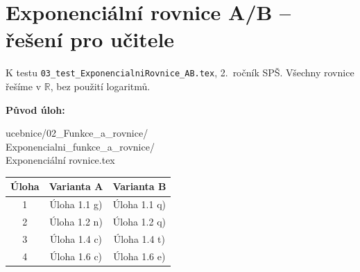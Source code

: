 \documentclass[a4paper,10pt]{article}
\begin{document}
\section*{Exponenciální rovnice A/B -- řešení pro učitele}
K testu \texttt{03\_test\_ExponencialniRovnice\_AB.tex}, 2.~ročník SPŠ.
Všechny rovnice řešíme v $\mathbb{R}$, bez použití logaritmů.

\smallskip
\textbf{Původ úloh:}
{\footnotesize\ttfamily
ucebnice/02\_Funkce\_a\_rovnice/\\
Exponencialni\_funkce\_a\_rovnice/\\
Exponenciální rovnice.tex\par}

\begin{center}
\begin{tabular}{c|cc}
Úloha & Varianta A & Varianta B \\ \hline
1 & Úloha 1.1 g) & Úloha 1.1 q) \\
2 & Úloha 1.2 n) & Úloha 1.2 q) \\
3 & Úloha 1.4 c) & Úloha 1.4 t) \\
4 & Úloha 1.6 c) & Úloha 1.6 e)
\end{tabular}
\end{center}
\end{document}
